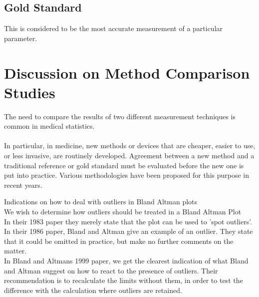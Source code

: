\documentclass[12pt, a4paper]{report}
\begin{document}
\subsection{Gold Standard} This is considered to be the most
accurate measurement of a particular parameter.
\section{Discussion on Method Comparison Studies}

The need to compare the results of two different measurement
techniques is common in medical statistics.
\\
\\
In particular, in medicine, new methods or devices that are
cheaper, easier to use, or less invasive, are routinely developed.
Agreement between a new method and a traditional reference or gold
standard must be evaluated before the new one is put into
practice. Various methodologies have been proposed for this
purpose in recent years.

Indications on how to deal with outliers in Bland Altman plots
\\
We wish to determine how outliers should be treated in a Bland
Altman Plot
\\
In their 1983 paper they merely state that the plot can be used to
'spot outliers'.
\\
In  their 1986 paper, Bland and Altman give an example of an
outlier. They state that it could be omitted in practice, but make
no further comments on the matter.
\\
In Bland and Altmans 1999 paper, we get the clearest indication of
what Bland and Altman suggest on how to react to the presence of
outliers. Their recommendation is to recalculate the limits
without them, in order to test the difference with the calculation
where outliers are retained.\\
\end{document}
